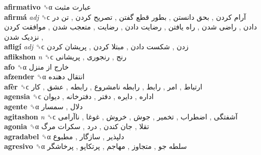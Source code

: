 \textbf{afirmativo} ␝α   عبارت مثبت   \\
\textbf{afirmá} \emph{adj}  ␝ϲ   آرام کردن ,  بحق دانستن ,  بطور قطع گفتن ,  تصریح کردن ,  تن در دادن ,  راضی شدن ,  راه یافتن ,  رضایت دادن ,  رضایت ,  متعجب شدن ,  موافقت کردن ,  نزدیک شدن   \\
\textbf{afligí} \emph{adj}  ␝ϲ   زدن ,  شکست دادن ,  مبتلا کردن ,  پریشان کردن   \\
\textbf{aflikshon} \emph{n}  ␝ϲ   رنج ,  رنجوری ,  پریشانی   \\
\textbf{afo} ␝α   خارج از منزل   \\
\textbf{afzender} ␝α   انتقال دهنده   \\
\textbf{afèr} ␝ϲ   ارتباط ,  امر ,  رابط ,  رابطه نامشروع ,  رابطه ,  عشق ,  کار   \\
\textbf{agensia} ␝ϲ   اداره ,  دایره ,  دفتر ,  دفترخانه ,  دیوان   \\
\textbf{agente} ␝α   دلال ,  سمسار   \\
\textbf{agitashon} \emph{n}  ␝ϲ   آشفتگی ,  اضطراب ,  تخمیر ,  جوش ,  خروش ,  غوغا ,  ناآرامی   \\
\textbf{agonia} ␝α   تقلا ,  جان کندن ,  درد ,  سکرات مرگ   \\
\textbf{agradabel} ␝α   دلپذیر ,  سازگار ,  مطبوع   \\
\textbf{agresivo} ␝α   سلطه جو ,  متجاوز ,  مهاجم ,  پرتکاپو ,  پرخاشگر   \\
